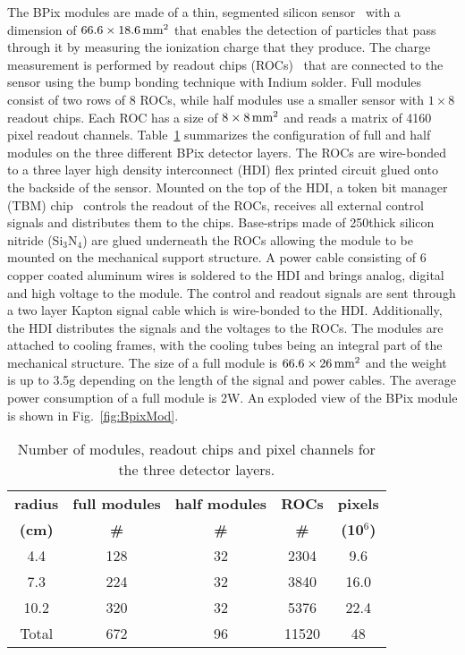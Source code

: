 The BPix modules are made of a thin, segmented silicon sensor~\cite{Allkofer200825} with a dimension of $66.6\times18.6\,\text{mm}^2$ that enables the detection of particles that pass through it by measuring the ionization charge that they produce.
The charge measurement is performed by readout chips (ROCs)~\cite{Kastli:2005jj} that are connected to the sensor using the bump bonding technique with Indium solder.
Full modules consist of two rows of 8 ROCs, while half modules use a smaller sensor with $1\times8$ readout chips.
Each ROC has a size of $8\times8\,\text{mm}^2$ and reads a matrix of 4160 pixel readout channels.
Table~\ref{tab:Nmodules} summarizes the configuration of full and half modules on the three different BPix detector layers.
The ROCs are wire-bonded to a three layer high density interconnect (HDI) flex printed circuit glued onto the backside of the sensor.
Mounted on the top of the HDI, a token bit manager (TBM) chip~\cite{Bartz:920426} controls the readout of the ROCs, receives all external control signals and distributes them to the chips.
Base-strips made of 250\mum thick silicon nitride (Si$_3$N$_4$) are glued underneath the ROCs allowing the module to be mounted on the mechanical support structure.
A power cable consisting of 6 copper coated aluminum wires is soldered to the HDI and brings analog, digital and high voltage to the module.
The control and readout signals are sent through a two layer Kapton signal cable which is wire-bonded to the HDI.
Additionally, the HDI distributes the signals and the voltages to the ROCs.
The modules are attached to cooling frames, with the cooling tubes being an integral part of the mechanical structure.
The size of a full module is $66.6\times26\,\text{mm}^2$ and the weight is up to 3.5\unit{g} depending on the length of the signal and power cables.
The average power consumption of a full module is 2\unit{W}. An exploded view of the BPix module is shown in Fig.~\ref{fig:BpixMod}.

\begin{table}[!htb]
  \caption{\small Number of modules, readout chips and pixel channels for the three detector layers.}
  \smallskip
  \centering
  \begin{tabular}{|c|c|c|c|c|}
    \hline
    {\bfseries radius} & {\bfseries full modules} & {\bfseries half modules} & {\bfseries ROCs}  & {\bfseries pixels}  \\
    {\bfseries (cm)}   & {\bfseries \#          } & {\bfseries \#          } & {\bfseries \#  }  & {\bfseries (10$^6$)}\\ \hline \hline
    4.4                & 128                      & 32                       & 2304              & 9.6     \\
    7.3                & 224                      & 32                       & 3840              & 16.0      \\ 
    10.2               & 320                      & 32                       & 5376              & 22.4    \\
    Total              & 672                      & 96                       & 11520             & 48      \\ \hline
  \end{tabular}
  \label{tab:Nmodules}
\end{table}

